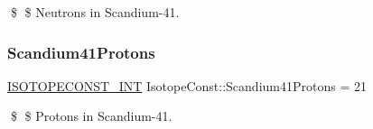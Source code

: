 \$ \$ Neutrons in Scandium-\/41. \mbox{\label{group___isotope_const-_scandium-_sc41_gad7b9fa5970286226b6e540d211443ba3}} 
\subsubsection{\texorpdfstring{Scandium41\+Protons}{Scandium41Protons}}
{\footnotesize\ttfamily \mbox{\hyperlink{group___isotope_const-_macros_ga5f18360b3e99483a35c32d789e62621c}{I\+S\+O\+T\+O\+P\+E\+C\+O\+N\+S\+T\+\_\+\+I\+NT}} Isotope\+Const\+::\+Scandium41\+Protons = 21}

\$ \$ Protons in Scandium-\/41. 